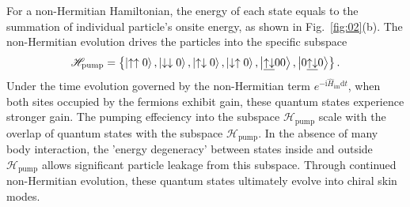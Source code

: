 \documentclass[longbibliography, aps, prx, amsmath, amssymb, amsfonts, twocolumn,superscriptaddress, footinbib]{revtex4-1}
\begin{document}

	For a non-Hermitian Hamiltonian, the energy of each state equals to the summation of individual particle's onsite energy, as shown in Fig.~\ref{fig:02}(b). The non-Hermitian evolution drives the particles into the specific subspace
	\begin{equation}
		\mathscr{H}_{\text{pump}}=\left\{ \ket{\uparrow\uparrow0}, \ket{\downarrow\downarrow0},\ket{\uparrow\downarrow0},\ket{\downarrow\uparrow0},\ket{\underline{\uparrow\downarrow}00},\ket{0\underline{\uparrow\downarrow}0}\right\}.
	\end{equation}
	Under the time evolution governed by the non-Hermitian term $e^{-\mathrm{i}\hat{H}_{\text{im}} \mathrm{d}t}$, when both sites occupied by the fermions exhibit gain, these quantum states experience stronger gain. 
	The pumping effeciency into the subspace $\mathscr{H}_{\text{pump}}$ 
	scale with the overlap of quantum states with the subspace $\mathscr{H}_{\text{pump}}$. 
	In the absence of many body interaction, the 'energy degeneracy' between states inside and outside $\mathscr{H}_{\text{pump}}$ allows significant particle leakage from this subspace.
	Through continued non-Hermitian evolution, these quantum states ultimately evolve into chiral skin modes.
\end{document}
